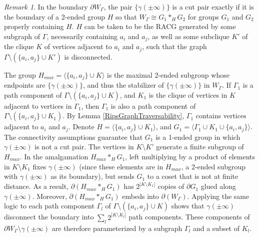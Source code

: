 \documentclass{amsart}
\theoremstyle{definition}
\theoremstyle{remark}
\newtheorem{remark}[theorem]{Remark}
\begin{document}
    \begin{remark}
		
		In the boundary $\partial W_\Gamma$, the pair $\{\gamma(\pm\infty)\}$ is a cut pair exactly if it is the boundary of a 2-ended group $H$ so that $W_\Gamma \cong G_1*_HG_2$ for groups $G_1$ and $G_2$ properly containing $H$. $H$ can be taken to be the RACG generated by some subgraph of $\Gamma$, necessarily containing $a_i$ and $a_j$, as well as some subclique $K'$ of the clique $K$ of vertices adjacent to $a_i$ and $a_j$, such that the graph $\Gamma\setminus( \{a_i, a_j\}\cup K')$ is disconnected.
		
		The group $H_{max}=\langle \{a_i, a_j\}\cup K\rangle$ is the maximal 2-ended subgroup whose endpoints are $\{\gamma(\pm\infty)\}$, and thus the stabilizer of $\{\gamma(\pm\infty)\}$ in $W_\Gamma$. If $\Gamma_1$ is a path component of \newline $\Gamma\setminus (\{a_i, a_j\}\cup K)$, and $K_1$ is the clique of vertices in $K$ adjacent to vertices in $\Gamma_1$, then $\Gamma_1$ is also a path component of $\Gamma\setminus (\{a_i, a_j\}\cup K_1)$. By Lemma \ref{RipsGraphTraversability}, $\Gamma_1$ contains vertices adjacent to $a_i$ and $a_j$.  Denote $H=\langle \{a_i, a_j\}\cup K_1\rangle$, and $G_1=\langle \Gamma_1\cup K_1 \cup \{a_i, a_j\}\rangle$. The connectivity assumptions guarantee that $G_1$ is a 1-ended group in which $\gamma(\pm \infty)$ is not a cut pair. The vertices in $K\setminus K'$ generate a finite subgroup of $H_{max}$. In the amalgamation $H_{max}*_H G_1$, left multiplying by a product of elements in $K\setminus K_1$ fixes $\gamma(\pm\infty)$ (since these elements are in $H_{max}$, a 2-ended subgroup with $\gamma(\pm\infty)$ as its boundary), but sends $G_1$ to a coset that is not at finite distance. As a result, $\partial(H_{max}*_H G_1)$ has $2^{|K\setminus K_1|}$ copies of $\partial G_1$ glued along $\gamma(\pm\infty)$. Moreover, $\partial(H_{max}*_H G_1)$ embeds into $\partial(W_\Gamma)$. Applying the same logic to each path component $\Gamma_l$ of $\Gamma\setminus (\{a_i, a_j\}\cup K)$ shows that $\gamma(\pm\infty)$ disconnect the boundary into $\sum _l 2^{|K\setminus K_l|}$ path components. These components of $\partial W_\Gamma\setminus \gamma(\pm\infty)$ are therefore parameterized by a subgraph $\Gamma_l$ and a subset of $K_l$.	
    \end{remark}
\end{document}
